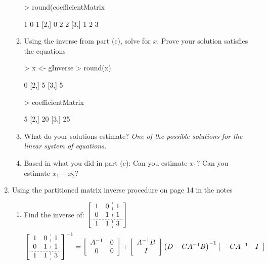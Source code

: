 \documentclass[12pt,a4paper]{paper}
\begin{document}
\begin{enumerate}
\begin{enumerate}
\begin{Schunk}
\begin{Sinput}
> round(coefficientMatrix %*% gInverse %*% coefficientMatrix)
\end{Sinput}
\begin{Soutput}
     [,1] [,2] [,3]
[1,]    1    0    1
[2,]    0    2    2
[3,]    1    2    3
\end{Soutput}
\end{Schunk}
\item Using the inverse from part (c), solve for $x$. Prove your solution satisfies the equations
\begin{Schunk}
\begin{Sinput}
> x <- gInverse %*% c(5, 20, 25)
> round(x)
\end{Sinput}
\begin{Soutput}
     [,1]
[1,]    0
[2,]    5
[3,]    5
\end{Soutput}
\begin{Sinput}
> coefficientMatrix %*% x
\end{Sinput}
\begin{Soutput}
     [,1]
[1,]    5
[2,]   20
[3,]   25
\end{Soutput}
\end{Schunk}
\item What do your solutions estimate? \emph{One of the possible solutions for the linear system of equations.}
\item Based in what you did in part (e): Can you estimate $x_{1}$? Can you estimate $x_{1} - x_{2}$?
\end{enumerate}
\item Using the partitioned matrix inverse procedure on page 14 in the notes
\begin{enumerate}
\item Find the inverse of: $\left[\begin{array}{cc:c}1&0&1\\0&1&1\\\hdashline[2pt/2pt]1&1&3\end{array}\right]$
\begin{align*}
\left[\begin{array}{cc:c}1&0&1\\0&1&1\\\hdashline[2pt/2pt]1&1&3\end{array}\right]^{-1} &= \left[\begin{array}{cc}A^{-1}&0\\0&0\end{array}\right] + \left[\begin{array}{c}A^{-1}B\\I\end{array}\right]\left(D-CA^{-1}B\right)^{-1}\left[\begin{array}{cc}-CA^{-1}&I\end{array}\right]\\

\end{align*}
\end{enumerate}
\end{enumerate}
\end{document}
